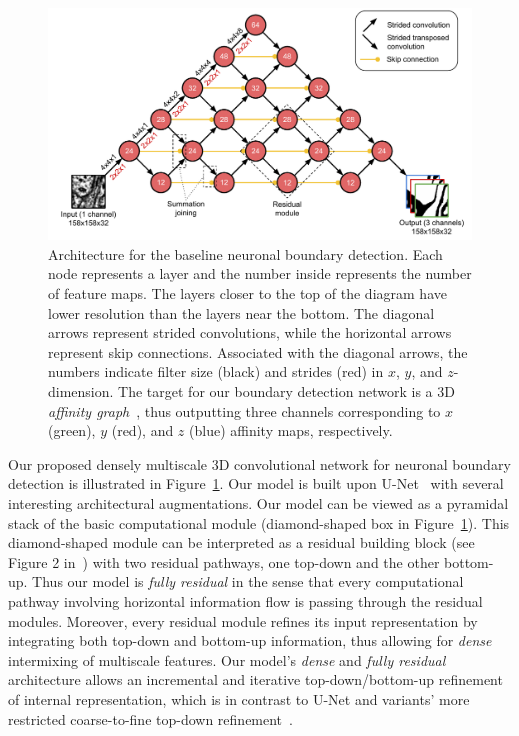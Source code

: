 \begin{figure}[!b]
\centering
\includegraphics[width=1.0\linewidth]{baseline.pdf}

\caption{Architecture for the baseline neuronal boundary detection. Each node
represents a layer and the number inside represents the number of feature maps.
The layers closer to the top of the diagram have lower resolution than the
layers near the bottom. The diagonal arrows represent strided convolutions,
while the horizontal arrows represent skip connections. Associated with the
diagonal arrows, the numbers indicate filter size (black) and strides (red) in
$x$, $y$, and $z$-dimension. The target for our boundary detection network is a
3D \emph{affinity graph}~\cite{boundary_detection,kisuk,funke2017deep}, thus
outputting three channels corresponding to $x$ (green), $y$ (red), and $z$
(blue) affinity maps, respectively.}

\label{fig:boundary_detector}
\end{figure}

Our proposed densely multiscale 3D convolutional network for neuronal boundary
detection is illustrated in Figure~\ref{fig:boundary_detector}. Our model is
built upon U-Net~\cite{unet} with several interesting architectural
augmentations. Our model can be viewed as a pyramidal stack of the basic
computational module (diamond-shaped box in Figure~\ref{fig:boundary_detector}).
This diamond-shaped module can be interpreted as a residual building block (see
Figure 2 in~\cite{resnet}) with two residual pathways, one top-down and the
other bottom-up. Thus our model is \emph{fully residual} in the sense that every
computational pathway involving horizontal information flow is passing through
the residual modules. Moreover, every residual module refines its input
representation by integrating both top-down and bottom-up information, thus
allowing for \emph{dense} intermixing of multiscale features. Our model's
\emph{dense} and \emph{fully residual} architecture allows an incremental and
iterative top-down/bottom-up refinement of internal representation, which is in
contrast to U-Net and variants' more restricted coarse-to-fine top-down
refinement~\cite{unet,pinheiro2016refine,lin2016pyramid}.

